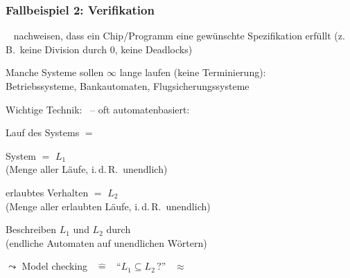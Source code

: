     \begin{frame}
      \frametitle{Fallbeispiel 2: Verifikation}
      
      ~ nachweisen, dass ein Chip/Programm eine gewünschte
      Spezifikation erfüllt (z.\,B.\ keine Division durch 0, keine Deadlocks)
      
      \par\medskip
      Manche Systeme sollen $\infty$ lange laufen (keine Terminierung): \\
      Betriebssysteme, Bankautomaten, Flugsicherungssysteme
      
      \par\medskip
      Wichtige Technik:~  -- oft automatenbasiert:
      
      \begin{Itemize}
        \item
          Lauf des Systems $=$ 
        \item
          System $=$  $L_1$ \\
          (Menge aller Läufe, i.\,d.\,R.\ unendlich)
        \item
          erlaubtes Verhalten $=$  $L_2$ \\
          (Menge aller erlaubten Läufe, i.\,d.\,R.\ unendlich)
        \item
          Beschreiben $L_1$ und $L_2$ durch  \\
          (endliche Automaten auf unendlichen Wörtern)
        \item[$\leadsto$]
          Model checking ~$\hat=$~ "`$L_1 \subseteq L_2\,?$"'
          ~$\approx$~ 
      \end{Itemize}
    
    \end{frame}
    
